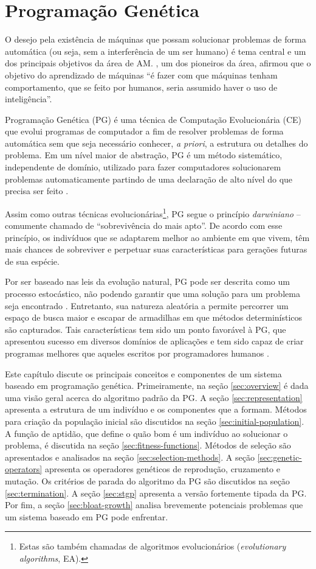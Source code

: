 \chapter{Programação Genética} \label{chapter:genetic-programming}
O desejo pela existência de máquinas que possam solucionar problemas de forma automática (ou seja, sem a interferência de um ser humano) é tema central e um dos principais objetivos da área de AM. , um dos pioneiros da área, afirmou que o objetivo do aprendizado de máquinas ``é fazer com que máquinas tenham comportamento, que se feito por humanos, seria assumido haver o uso de inteligência''.

Programação Genética (PG) é uma técnica de Computação Evolucionária (CE) que evolui programas de computador a fim de resolver problemas de forma automática sem que seja necessário conhecer, \textit{a priori}, a estrutura ou detalhes do problema. Em um nível maior de abstração, PG é um método sistemático, independente de domínio, utilizado para fazer computadores solucionarem problemas automaticamente partindo de uma declaração de alto nível do que precisa ser feito \cite{poli2008}.

Assim como outras técnicas evolucionárias\footnote{Estas são também chamadas de algoritmos evolucionários (\textit{evolutionary algorithms}, EA).}, PG segue o princípio \textit{darwiniano} -- comumente chamado de ``sobrevivência do mais apto''. De acordo com esse princípio, os indivíduos que se adaptarem melhor ao ambiente em que vivem, têm mais chances de sobreviver e perpetuar suas características para gerações futuras de sua espécie.

Por ser baseado nas leis da evolução natural, PG pode ser descrita como um processo estocástico, não podendo garantir que uma solução para um problema seja encontrado \cite{poli2008}. Entretanto, sua natureza aleatória a permite percorrer um espaço de busca maior e escapar de armadilhas em que métodos determinísticos são capturados. Tais características tem sido um ponto favorável à PG, que apresentou sucesso em diversos domínios de aplicações e tem sido capaz de criar programas melhores que aqueles escritos por programadores humanos \cite{banzhaf1998}.

Este capítulo discute os principais conceitos e componentes de um sistema baseado em programação genética. Primeiramente, na seção \ref{sec:overview} é dada uma visão geral acerca do algoritmo padrão da PG. A seção \ref{sec:representation} apresenta a estrutura de um indivíduo e os componentes que a formam. Métodos para criação da população inicial são discutidos na seção \ref{sec:initial-population}. A função de aptidão, que define o quão bom é um indivíduo ao solucionar o problema, é discutida na seção \ref{sec:fitness-functions}. Métodos de seleção são apresentados e analisados na seção \ref{sec:selection-methods}. A seção \ref{sec:genetic-operators} apresenta os operadores genéticos de reprodução, cruzamento e mutação. Os critérios de parada do algoritmo da PG são discutidos na seção \ref{sec:termination}. A seção \ref{sec:stgp} apresenta a versão fortemente tipada da PG. Por fim, a seção \ref{sec:bloat-growth} analisa brevemente potenciais problemas que um sistema baseado em PG pode enfrentar.

